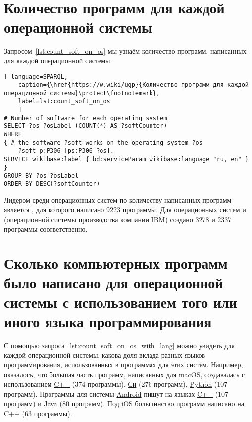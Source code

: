 \section{Количество программ для каждой операционной системы}

Запросом~\ref{lst:count_soft_on_os} мы узнаём количество программ, 
написанных для каждой операционной системы.

\begin{lstlisting}[ language=SPARQL, 
	caption={\href{https://w.wiki/ugp}{Количество программ для каждой операционной системы}\protect\footnotemark},
	label=lst:count_soft_on_os
	]
# Number of software for each operating system
SELECT ?os ?osLabel (COUNT(*) AS ?softCounter)
WHERE
{ # the software ?soft works on the operating system ?os
	?soft p:P306 [ps:P306 ?os].
SERVICE wikibase:label { bd:serviceParam wikibase:language "ru, en" }
}
GROUP BY ?os ?osLabel
ORDER BY DESC(?softCounter)
\end{lstlisting}

Лидером среди операционных систем по количеству написанных программ является , для которого написано \num{9223} программы. Для операционных систем  и   (операционной системы производства компании \href{https://www.wikidata.org/wiki/Q37156}{IBM}) создано \num{3278} и \num{2337} программы соответственно.


\section{Сколько компьютерных программ было написано для операционной системы с использованием того или иного языка программирования}

С помощью запроса~\ref{lst:count_soft_on_os_with_lang} можно увидеть для каждой операционной системы, 
какова доля вклада разных языков программирования, использованных в программах для этих систем. 
Например, оказалось, что большая часть программ, 
написанных для \href{https://www.wikidata.org/wiki/Q14116}{macOS}, 
создавалась с использованием \href{https://www.wikidata.org/wiki/Q2407}{C++} (374 программы), 
\href{https://www.wikidata.org/wiki/Q15777}{Си} (276 программ), 
\href{https://www.wikidata.org/wiki/Q28865}{Python} (107 программ).
Программы для системы \href{https://www.wikidata.org/wiki/Q94}{Android} пишут 
на языках \href{https://www.wikidata.org/wiki/Q2407}{C++} (107 программ) 
и \href{https://www.wikidata.org/wiki/Q251}{Java} (80 программ).
Под \href{https://www.wikidata.org/wiki/Q48493}{iOS} большинство программ 
написано на \href{https://www.wikidata.org/wiki/Q2407}{C++} (63 программы).

